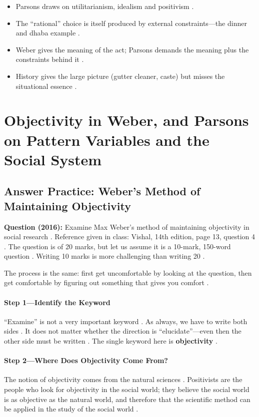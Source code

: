\begin{QuickRevision}
\begin{itemize}
    \item Parsons draws on utilitarianism, idealism and positivism .
    \item The ``rational'' choice is itself produced by external constraints---the dinner and dhaba example .
    \item Weber gives the meaning of the act; Parsons demands the meaning plus the constraints behind it .
    \item History gives the large picture (gutter cleaner, caste) but misses the situational essence .
\end{itemize}
\end{QuickRevision}

\sectiondivider

\section{Objectivity in Weber, and Parsons on Pattern Variables and the Social System}

\subsection{Answer Practice: Weber's Method of Maintaining Objectivity}

\begin{PYQLink}
\textbf{Question (2016):} Examine Max Weber's method of maintaining objectivity in social research . Reference given in class: Vishal, 14th edition, page 13, question 4 .
The question is of 20 marks, but let us assume it is a 10-mark, 150-word question . Writing 10 marks is more challenging than writing 20 .
\end{PYQLink}

The process is the same: first get uncomfortable by looking at the question, then get comfortable by figuring out something that gives you comfort .

\paragraph{Step 1---Identify the Keyword}
``Examine'' is not a very important keyword . As always, we have to write both sides . It does not matter whether the direction is ``elucidate''---even then the other side must be written .
The single keyword here is \textbf{objectivity} .

\paragraph{Step 2---Where Does Objectivity Come From?}
The notion of objectivity comes from the natural sciences . Positivists are the people who look for objectivity in the social world; they believe the social world is as objective as the natural world, and therefore that the scientific method can be applied in the study of the social world .

